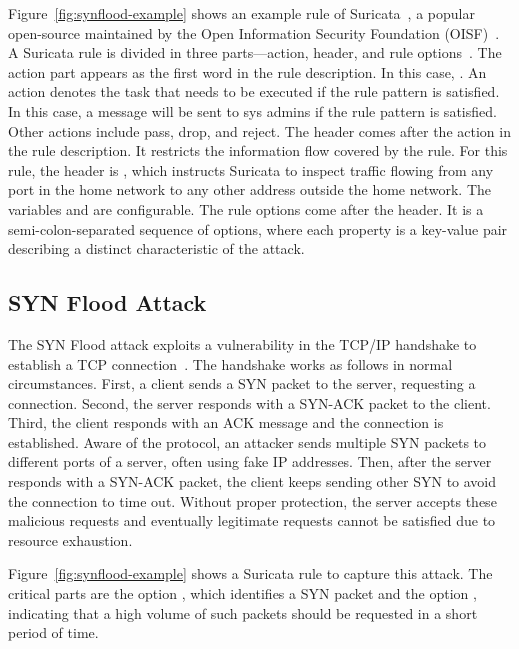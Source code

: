 \documentclass[conference]{IEEEtran}
\begin{document}
Figure~\ref{fig:synflood-example} shows an example rule of
Suricata~\cite{suricata}, a popular open-source \nids{} maintained by
the Open Information Security Foundation (OISF)~\cite{oisf}. A
Suricata rule is divided in three parts---action, header, and rule
options~\cite{suri-rule-format}. The action part appears as the first
word in the rule description. In this case, . An action
denotes the task that needs to be executed if the rule pattern is
satisfied. In this case, a message will be sent to sys admins if the
rule pattern is satisfied. Other actions include pass, drop, and
reject. The header comes after the action in the rule description. It
restricts the information flow covered by the rule. For this rule, the
header is , which
instructs Suricata to inspect  traffic flowing from any
port in the home network to any other address outside the home
network. The variables  and
 are configurable. The rule options come after
the header. It is a semi-colon-separated sequence of options, where
each property is a key-value pair describing a distinct characteristic
of the attack.

\subsection{SYN Flood Attack}

The SYN Flood attack exploits a vulnerability in the TCP/IP handshake
to establish a TCP connection~\cite{cloudfare-synflood}. The handshake
works as follows in normal circumstances. First, a client sends a SYN
packet to the server, requesting a connection. Second, the server
responds with a SYN-ACK packet to the client. Third, the client
responds with an ACK message and the connection is established. Aware
of the protocol, an attacker sends multiple SYN packets to different
ports of a server, often using fake IP addresses. Then, after the
server responds with a SYN-ACK packet, the client keeps sending other
SYN to avoid the connection to time out. Without proper protection,
the server accepts these malicious requests and eventually legitimate
requests cannot be satisfied due to resource exhaustion.

Figure~\ref{fig:synflood-example} shows a Suricata rule to capture
this attack. The critical parts are the option ,
which identifies a SYN packet and the option , indicating that a high
volume of such packets should be requested in a short period of
time.
\end{document}
